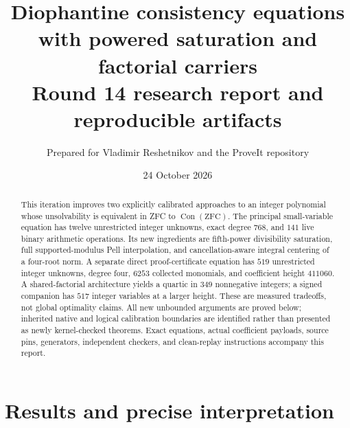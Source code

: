 \documentclass[11pt,a4paper]{article}
\title{Diophantine consistency equations with powered saturation and factorial carriers\\[8pt]\large Round 14 research report and reproducible artifacts}
\author{Prepared for Vladimir Reshetnikov and the ProveIt repository}
\date{24 October 2026}
\newcommand{\Con}{\operatorname{Con}}\newcommand{\vp}{v_p}
\theoremstyle{remark}\newtheorem{remark}[theorem]{Remark}
\begin{document}
\maketitle
\begin{abstract}
This iteration improves two explicitly calibrated approaches to an integer polynomial whose unsolvability is equivalent in ZFC to $\Con(\mathrm{ZFC})$. The principal small-variable equation has twelve unrestricted integer unknowns, exact degree $768$, and $141$ live binary arithmetic operations. Its new ingredients are fifth-power divisibility saturation, full supported-modulus Pell interpolation, and cancellation-aware integral centering of a four-root norm. A separate direct proof-certificate equation has $519$ unrestricted integer unknowns, degree four, $6253$ collected monomials, and coefficient height $411060$. A shared-factorial architecture yields a quartic in $349$ nonnegative integers; a signed companion has $517$ integer variables at a larger height. These are measured tradeoffs, not global optimality claims. All new unbounded arguments are proved below; inherited native and logical calibration boundaries are identified rather than presented as newly kernel-checked theorems. Exact equations, actual coefficient payloads, source pins, generators, independent checkers, and clean-replay instructions accompany this report.
\end{abstract}
\tableofcontents
\clearpage
\section{Results and precise interpretation}
\end{document}
